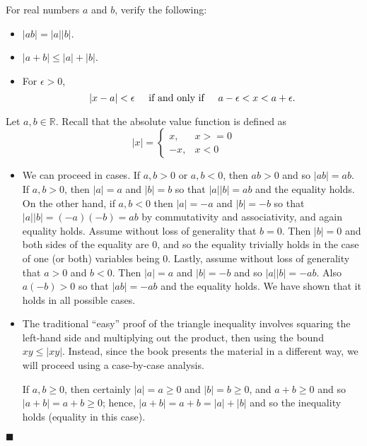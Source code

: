 \documentclass[12pt]{article}
\renewcommand{\qed}{\hfill$\blacksquare$}
\renewenvironment{proof}{\begin{addmargin}[1em]{0em}\begin{newproof}}{\end{newproof}\end{addmargin}\qed}
\newenvironment{problem}[2][Problem]{\begin{trivlist}
\item[\hskip \labelsep {\bfseries #1}\hskip \labelsep {\bfseries #2.}]}{\end{trivlist}}
\begin{document}
\begin{problem}{1.1.7}
For real numbers $a$ and $b$, verify the following:
\begin{itemize}
	\item $\left|ab\right| = \left|a\right|\left|b\right|$.
	\item $\left|a+b\right| \leq \left|a\right| + \left|b\right|$.
	\item For $\epsilon >0$, \[ \left|x-a\right| < \epsilon \hspace{5mm} \text{if and only if} \hspace{5mm} a-\epsilon < x < a + \epsilon . \]
\end{itemize}
\end{problem}
\begin{proof}
Let $a,b\in \mathbb{R}$. Recall that the absolute value function is defined as \[ \left|x\right| = \left\{ \begin{array}{lr} x, & x>=0 \\ -x, & x<0 \end{array} \right. \]
\begin{itemize}
	\item We can proceed in cases. If $a,b>0$ or $a,b <0$, then $ab > 0$ and so $\left|ab\right| = ab$. If $a,b>0$, then $\left|a\right| = a $ and $\left|b\right|= b $ so that $\left|a\right|\left|b\right|=ab$ and the equality holds. On the other hand, if $a,b <0$ then $\left|a\right|=-a$ and $\left|b\right|=-b$ so that $\left|a\right|\left|b\right|=\left(-a\right)\left(-b\right) = ab$ by commutativity and associativity, and again equality holds. Assume without loss of generality that $b=0$. Then $\left|b\right|=0$ and both sides of the equality are $0$, and so the equality trivially holds in the case of one (or both) variables being $0$. Lastly, assume without loss of generality that $a>0$ and $b<0$. Then $\left|a\right|=a$ and $\left|b\right|=-b$ and so $\left|a\right|\left|b\right| = -ab$. Also $a\left(-b\right) >0$ so that $\left|ab\right| = -ab$ and the equality holds. We have shown that it holds in all possible cases. 
	
	\item The traditional ``easy'' proof of the triangle inequality involves squaring the left-hand side and multiplying out the product, then using the bound $xy \leq \left|xy\right|$. Instead, since the book presents the material in a different way, we will proceed using a case-by-case analysis.
	
	If $a,b \geq 0$, then certainly $\left|a\right| = a \geq 0$ and $\left|b\right| = b \geq 0$, and $a+b \geq 0 $ and so $\left|a+b\right| = a+b \geq 0$; hence, $\left|a+b\right| = a+b = \left|a\right| + \left|b\right|$ and so the inequality holds (equality in this case).
	

\end{itemize}
\end{proof}
\end{document}
